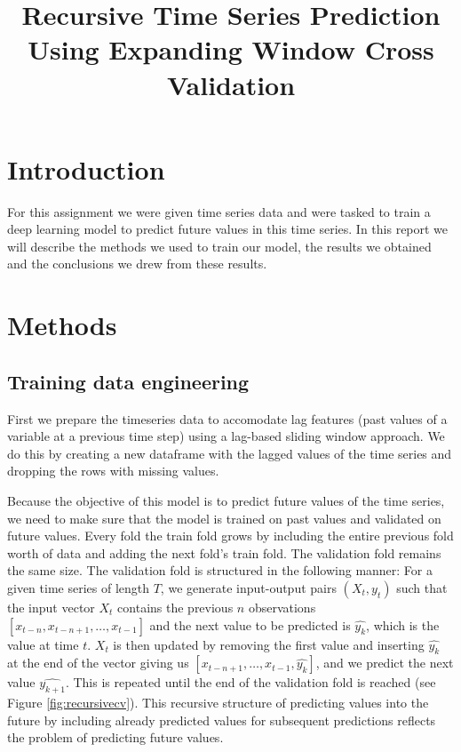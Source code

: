 \documentclass[conference]{IEEEtran}
\begin{document}
\title{Recursive Time Series Prediction Using Expanding Window Cross Validation\\}

\author{
\and
{}
\and
{}
\and
{}
}

\maketitle

\section{Introduction}
For this assignment we were given time series data and were tasked to train a deep learning model
to predict future values in this time series. In this report we will describe the methods we used 
to train our model, the results we obtained and the conclusions we drew from these results.

\section{Methods}
\subsection{Training data engineering}
First we prepare the timeseries data to accomodate lag features (past values of a variable at a
previous time step) using a lag-based sliding window approach. We do this by creating a new 
dataframe with the lagged values of the time series and dropping the rows with missing values.

Because the objective of this model is to predict future values of the time series, we need to
make sure that the model is trained on past values and validated on future values. Every fold the 
train fold grows by including the entire previous fold worth of data and adding the next fold's train fold.  
The validation fold remains the same size. The validation fold is structured in the following manner:
For a given time series of length $T$, we generate input-output pairs $(X_t,y_t)$ such that the 
input vector $X_t$ contains the previous $n$ observations $[x_{t-n}, x_{t-n+1}, \ldots, x_{t-1}]$ 
and the next value to be predicted is $\hat{y_k}$, which is the value at time $t$. $X_t$ is then 
updated by removing the first value and inserting $\hat{y_k}$ at the end of the vector giving us
$[x_{t-n+1}, \ldots, x_{t-1}, \hat{y_k}]$, and we predict the next value $\hat{y_{k+1}}$. This is 
repeated until the end of the validation fold is reached (see Figure \ref{fig:recursivecv}). This recursive structure of predicting 
values into the future by including already predicted values for subsequent predictions reflects 
the problem of predicting future values. 
\end{document}
